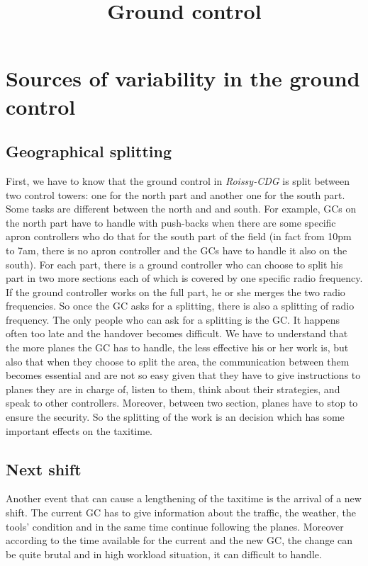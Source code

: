 \documentclass{article}
\title{Ground control}
\begin{document}
\maketitle
\section{Sources of variability in the ground control}
\subsection{Geographical splitting}
First, we have to know that the ground control in \textit{Roissy-CDG} is split between two control towers: one for the north part and another one for the south part. Some tasks are different between the north and and south. For example, GCs on the north part have to handle with push-backs when there are some specific apron controllers who do that for the south part of the field (in fact from 10pm to 7am, there is no apron controller and the GCs have to handle it also on the south). For each part, there is a ground controller who can choose to split his part in two more sections each of which is covered by one specific radio frequency. If the ground controller works on the full part, he or she merges the two radio frequencies. So once the GC asks for a splitting, there is also a splitting of radio frequency. The only people who can ask for a splitting is the GC. It happens often too late and the handover becomes difficult. We have to understand that the more planes the GC has to handle, the less effective his or her work is, but also that when they choose to split the area, the communication between them becomes essential and are not so easy given that they have to give instructions to planes they are in charge of, listen to them, think about their strategies, and speak to other controllers. Moreover, between two section, planes have to stop to ensure the security. So the splitting of the work is an decision which has some important effects on the taxitime. 
\subsection{Next shift}
Another event that can cause a lengthening of the taxitime is the arrival of a new shift. The current GC has to give information about the traffic, the weather, the tools' condition and in the same time continue following the planes. Moreover according to the time available for the current and the new GC, the change can be quite brutal and in high workload situation, it can difficult to handle. 
\end{document}
